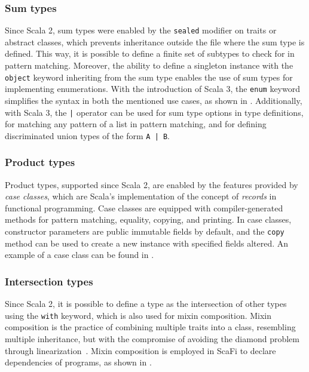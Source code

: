 \subsubsection{Sum types}

Since Scala 2, sum types were enabled by the \texttt{sealed} modifier on traits or abstract classes, which prevents inheritance outside the file where the sum type is defined.
%
This way, it is possible to define a finite set of subtypes to check for in pattern matching.
%
Moreover, the ability to define a singleton instance with the \texttt{object} keyword inheriting from the sum type enables the use of sum types for implementing enumerations.
%
With the introduction of Scala 3, the \texttt{enum} keyword simplifies the syntax in both the mentioned use cases, as shown in .
%
Additionally, with Scala 3, the \texttt{|} operator can be used for sum type options in type definitions, for matching any pattern of a list in pattern matching, and for defining discriminated union types of the form \texttt{A | B}.



\subsubsection{Product types}

Product types, supported since Scala 2, are enabled by the features provided by \textit{case classes}, which are Scala's implementation of the concept of \textit{records} in functional programming.
%
Case classes are equipped with compiler-generated methods for pattern matching, equality, copying, and printing.
%
In case classes, constructor parameters are public immutable fields by default, and the \texttt{copy} method can be used to create a new instance with specified fields altered.
%
An example of a case class can be found in .

\subsubsection{Intersection types}

Since Scala 2, it is possible to define a type as the intersection of other types using the \texttt{with} keyword, which is also used for mixin composition.
%
Mixin composition is the practice of combining multiple traits into a class, resembling multiple inheritance, but with the compromise of avoiding the diamond problem through linearization~\cite{scala-patterns}.
%
Mixin composition is employed in ScaFi to declare dependencies of programs, as shown in .

